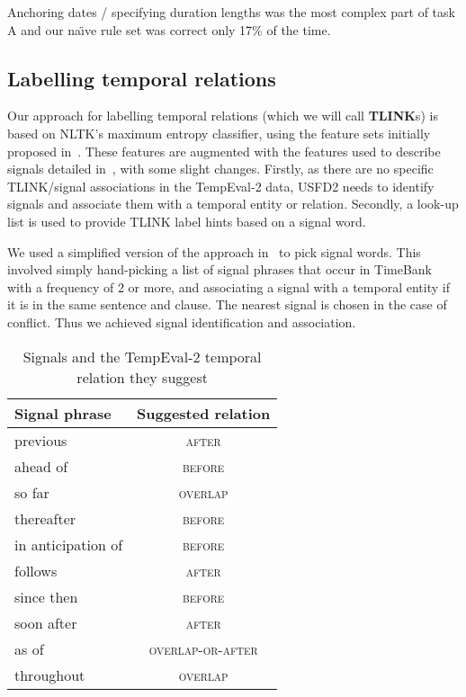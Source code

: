 \documentclass[11pt]{article}
\begin{document}
Anchoring dates / specifying duration lengths was the most complex part of task A and our na\"{\i}ve rule set was correct only 17\% of the time.

\subsection{Labelling temporal relations}
\label{tlink} 

Our approach for labelling temporal relations (which we will call \textbf{TLINK}s) is based on NLTK's maximum entropy classifier, using the feature sets initially proposed in~. These features are augmented with the features used to describe signals detailed in~, with some slight changes. Firstly, as there are no specific TLINK/signal associations in the TempEval-2 data, USFD2 needs to identify signals and associate them with a temporal entity or relation. Secondly, a look-up list is used to provide TLINK label hints based on a signal word.

We used a simplified version of the approach in~ to pick signal words. This involved simply hand-picking a list of signal phrases that occur in TimeBank~\cite{pustejovsky2003timebank} with a frequency of 2 or more, and associating a signal with a temporal entity if it is in the same sentence and clause. The nearest signal is chosen in the case of conflict. Thus we achieved signal identification and association.

\begin{table}
\begin{center}
\caption{Signals and the TempEval-2 temporal relation they suggest}
\label{tab:signalHints}
\begin{tabular}{| l | c |}
\hline
 Signal phrase & Suggested relation \\
\hline
previous & \textsc{after} \\
ahead of & \textsc{before} \\
so far & \textsc{overlap} \\
thereafter & \textsc{before} \\
in anticipation of & \textsc{before} \\
follows & \textsc{after} \\
since then & \textsc{before} \\
soon after & \textsc{after} \\
as of & \textsc{overlap-or-after} \\
throughout & \textsc{overlap} \\
\hline
\end{tabular}
\end{center}
\end{table}
\end{document}
